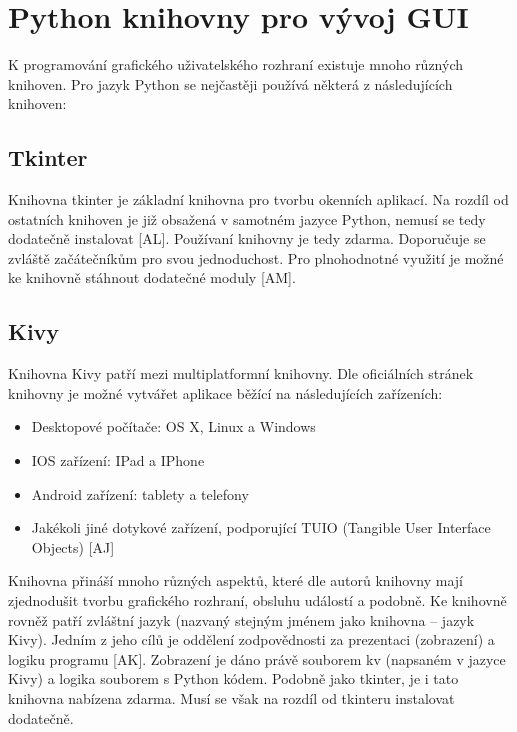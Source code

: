 \section{Python knihovny pro vývoj GUI}
K programování grafického uživatelského rozhraní existuje mnoho různých knihoven. Pro jazyk Python se nejčastěji používá některá z následujících knihoven:

\subsection*{Tkinter}

Knihovna tkinter je základní knihovna pro tvorbu okenních aplikací. Na rozdíl od ostatních knihoven je již obsažená v samotném jazyce Python, nemusí se tedy dodatečně instalovat [AL]. Používaní knihovny je tedy zdarma.\newline
Doporučuje se zvláště začátečníkům pro svou jednoduchost. Pro plnohodnotné využití je možné ke knihovně stáhnout dodatečné moduly [AM].

\subsection*{Kivy}

Knihovna Kivy patří mezi multiplatformní knihovny. Dle oficiálních stránek knihovny je možné vytvářet aplikace běžící na následujících zařízeních:

\begin{itemize}
    \item Desktopové počítače: OS X, Linux a Windows
    \item IOS zařízení: IPad a IPhone
    \item Android zařízení: tablety a telefony
    \item Jakékoli jiné dotykové zařízení, podporující TUIO (Tangible User Interface Objects) [AJ]
\end{itemize}

Knihovna přináší mnoho různých aspektů, které dle autorů knihovny mají zjednodušit tvorbu grafického rozhraní, obsluhu událostí a podobně.\newline
Ke knihovně rovněž patří zvláštní jazyk (nazvaný stejným jménem jako knihovna – jazyk Kivy). Jedním z jeho cílů je oddělení zodpovědnosti za prezentaci (zobrazení) a logiku programu [AK]. Zobrazení je dáno právě souborem kv (napsaném v jazyce Kivy) a logika souborem s Python kódem.\newline
Podobně jako tkinter, je i tato knihovna nabízena zdarma. Musí se však na rozdíl od tkinteru instalovat dodatečně.

